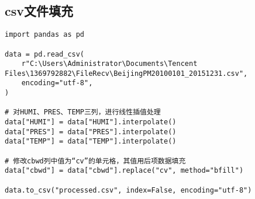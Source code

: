 \documentclass[lang=cn,11pt,a4paper]{elegantpaper}
\begin{document}
\subsection{csv文件填充}

\begin{lstlisting}
import pandas as pd

data = pd.read_csv(
    r"C:\Users\Administrator\Documents\Tencent Files\1369792882\FileRecv\BeijingPM20100101_20151231.csv",
    encoding="utf-8",
)

# 对HUMI、PRES、TEMP三列，进行线性插值处理
data["HUMI"] = data["HUMI"].interpolate()
data["PRES"] = data["PRES"].interpolate()
data["TEMP"] = data["TEMP"].interpolate()

# 修改cbwd列中值为“cv”的单元格，其值用后项数据填充
data["cbwd"] = data["cbwd"].replace("cv", method="bfill")

data.to_csv("processed.csv", index=False, encoding="utf-8")

\end{lstlisting}




\end{document}
